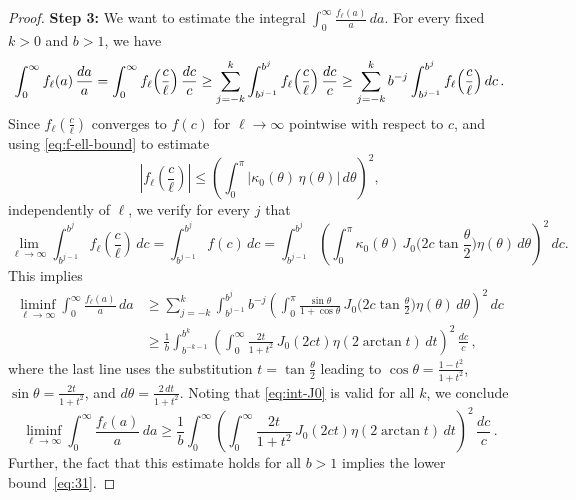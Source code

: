 \documentclass[a4paper,11pt,DIV=11,%
abstract=on%
]{scrartcl}
\newcommand{\red}[1]{#1}
\begin{document}
\begin{proof}
	\noindent
	\textbf{Step 3:} We want to estimate the integral
	$\int_0^\infty\frac{f_\ell(a)}{a}\,da$. For every fixed $k>0$ and $b>1$, we have
	\begin{equation*}
		\int_0^\infty f_\ell(a)\,\frac{da}{a}
		=\int_0^\infty f_\ell\Bigl(\frac{c}{\ell}\Bigr)\, \frac{dc}{c}
		\geq\sum_{j=-k}^k\int_{b^{j-1}}^{b^j}f_\ell\Bigl(\frac{c}{\ell}\Bigr)\, \frac{dc}{c}
		\geq\sum_{j=-k}^k b^{-j}\int_{b^{j-1}}^{b^j} f_\ell\Bigl(\frac{c}{\ell}\Bigr)\, dc\,.
	\end{equation*}
	Since $f_\ell(\frac{c}{\ell})$ converges to $f(c)$ for $\ell\to\infty$ pointwise
	with respect to $c$, and using \eqref{eq:f-ell-bound} to estimate
	$$\left|f_\ell\left(\frac{c}{\ell}\right)\right|
	\leq\left(\int_0^\pi|\kappa_0(\theta)\,\eta(\theta)|\,d\theta\right)^2,$$
	independently of $\ell$, we verify for every $j$ that
	\begin{equation*}
		\lim_{\ell\to\infty} \int_{b^{j-1}}^{b^j} f_\ell\left(\frac{c}{\ell }\right) \,dc
		= \int_{b^{j-1}}^{b^j} f(c)\, dc
		= \int_{b^{j-1}}^{b^j} \left( \int_0^\pi
		\kappa_0(\theta)\, J_0\biggl(2c\tan\frac\theta2\biggr) \eta(\theta)\,
		d\theta \right)^2 \,dc .
	\end{equation*}
	This implies 
	\begin{align}
		\liminf_{\ell\to\infty} \int_0^\infty \frac{f_\ell(a)}{a}\, da
		&\ge \sum_{j=-k}^k\int_{b^{j-1}}^{b^j}b^{-j}
		\left( \int_0^\pi \frac{\sin\theta}{1+\cos\theta}\, J_0\biggl(2c\tan\frac\theta2\biggr)
		\eta(\theta)\, d\theta \right)^2\, dc \nonumber\\
		&\geq \frac{1}{b}\int_{b^{-k-1}}^{b^k}
		\left( \int_0^\infty \frac{2t}{1+t^2}\, J_0(2ct) \eta(2\arctan t)\, dt \right)^2
		\, \frac{dc}{c}\,,
		\label{eq:int-J0}
	\end{align}
	where the last line uses the substitution $t=\tan\frac\theta2$ leading to
	$\cos\theta=\frac{1-t^2}{1+t^2}$, $\sin\theta=\frac{2t}{1+t^2}$, and
	$d\theta = \frac{2\,dt}{1+t^2}$. Noting that \eqref{eq:int-J0} is valid for all $k$, 
	we 	conclude
	\begin{equation}
		\liminf_{\ell\to\infty} \int_0^\infty \frac{f_\ell(a)}{a}\, da
		\geq \frac{1}{b}\int_0^\infty
		\left( \int_0^\infty \frac{2t}{1+t^2}\, J_0(2ct) \eta(2\arctan t)\, dt \right)^2
		\, \frac{dc}{c}\,.
		\label{eq:int-J0-2}
	\end{equation}
	Further, the fact that this estimate holds for all $b>1$
        implies \red{the lower bound~\eqref{eq:31}.}
	

\end{proof}
\end{document}
